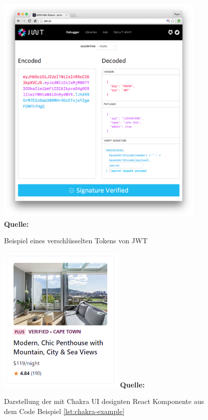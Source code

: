 \documentclass[a4paper,12pt]{report}
\begin{document}
  \begin{figure}[ht]
\raggedleft
  \includegraphics[width=100mm]{jwt-beispiel.png}
    \footnotesize\sffamily\textbf{Quelle:} \cite{JWT}
  \caption{Beispiel eines verschlüsselten Tokens von JWT}
  \label{fig:jwt-example}
\end{figure}

  \begin{figure}[ht]
\raggedleft
  \includegraphics[width=60mm]{Chakra-UI Beispiel.png}
    \footnotesize\sffamily\textbf{Quelle:} \cite{chakraui}
  \caption{Darstellung der mit Chakra UI designten React Komponente aus dem Code Beispiel \ref{lst:chakra-example}}
  \label{fig:chakra-example}
\end{figure}




\end{document}
